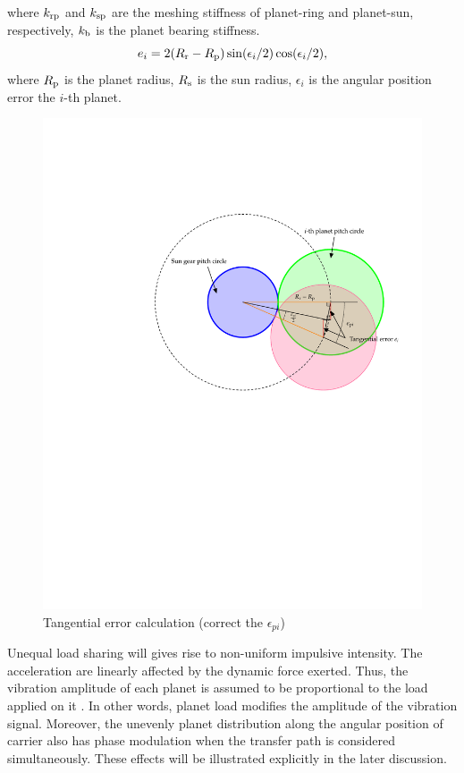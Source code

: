 \documentclass[a4paper,fleqn]{cas-sc}%
\begin{document}
where $k_{\rm rp}$ and $k_{\rm sp}$ are the meshing stiffness of planet-ring and planet-sun, respectively, $k_{\rm b}$ is the planet bearing stiffness.
\begin{equation}
    e_{i}=2(R_{\rm r}-R_{\rm p})\sin(\epsilon_{i}/2)\cos(\epsilon_{i}/2),\label{eq:tangential_error}
\end{equation}
where $R_{\rm p}$ is the planet radius, $R_{\rm s}$ is the sun radius, $\epsilon_{i}$ is the angular position error the $i$-th planet.
\begin{figure}[pos=htbp]
    \centering
    \includegraphics[scale=0.5]{tangential_error.pdf}
    \caption{Tangential error calculation (correct the $\epsilon_{pi}$)}
    \label{fig:tangential_error}
\end{figure}
\par Unequal load sharing will gives rise to non-uniform impulsive intensity. The acceleration are linearly affected by the dynamic force exerted. Thus, the vibration amplitude of each planet is assumed to be proportional to the load applied on it \cite{Inalpolat2009}. In other words, planet load modifies the amplitude of the vibration signal. Moreover, the unevenly planet distribution along the angular position of carrier also has phase modulation when the transfer path is considered simultaneously. These effects will be illustrated explicitly in the later discussion. 
\end{document}
